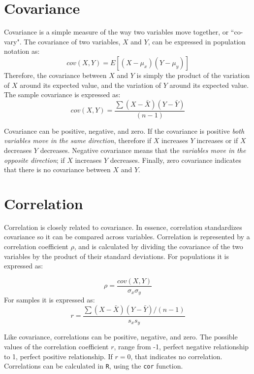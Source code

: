 \documentclass[11pt,openany]{book}\usepackage[]{graphicx}\usepackage[]{color}
\begin{document}
\section{Covariance}

Covariance is a simple measure of the way two variables move together, or ``co-vary".  The covariance of two variables, $X$ and $Y$, can be expressed in population notation as: 
\begin{equation}
cov(X,Y) = E[(X-\mu_{x})(Y-\mu_{y})]  
\end{equation}
Therefore, the covariance between $X$ and $Y$ is simply the product of
the variation of $X$ around its expected value,
and the variation of $Y$
around its expected value.
The sample covariance is expressed as: 
\begin{equation}
cov(X,Y) = \frac{\sum (X-\bar{X})(Y-\bar{Y})}{(n-1)}   
\end{equation}
   
Covariance can be positive, negative, and zero. If the covariance is positive \textit{both variables move in the same direction},
therefore if $X$ increases $Y$ increases or if $X$ decreases $Y$ decreases. Negative covariance means that the \textit{variables move
  in the opposite direction}; if $X$ increases $Y$ decreases. Finally, zero covariance indicates that there is no covariance between $X$ and
$Y$.

\section{Correlation} 

Correlation is closely related to covariance. In essence, correlation standardizes covariance so it can be compared across variables. Correlation is represented by a correlation coefficient $\rho$, and is calculated by dividing the covariance of the two variables by the product of their standard deviations. For populations it is expressed as:

\begin{equation}
\rho = \frac{cov(X,Y)}{\sigma_{x} \sigma_{y}}  
\end{equation}
For samples it is expressed as: 
\begin{equation}
r = \frac{\sum (X-\bar{X})(Y-\bar{Y})/(n-1)}{s_{x}s_{y}}  
\end{equation}

Like covariance, correlations can be positive, negative, and zero. The possible values of the correlation coefficient $r$, range
from -1, perfect negative relationship to 1, perfect positive relationship. If $r=0$, that indicates no correlation.  Correlations can be calculated in \texttt{R}, using the \texttt{cor} function. 
\end{document}
